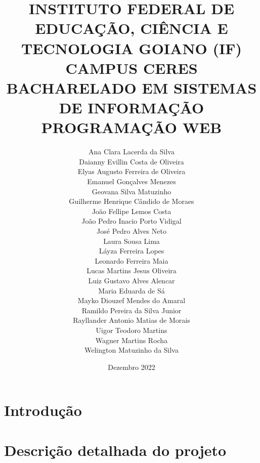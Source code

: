 \documentclass[12pt]{article}
\begin{document}
	\title{\textbf{ INSTITUTO FEDERAL DE EDUCAÇÃO, CIÊNCIA E TECNOLOGIA GOIANO (IF)\\CAMPUS CERES\\  BACHARELADO EM SISTEMAS DE INFORMAÇÃO\\PROGRAMAÇÃO  WEB}} 
	
	\author{Ana Clara Lacerda da Silva\\ Daianny Evillin Costa de Oliveira\\ Elyas Augusto Ferreira de Oliveira\\ Emanuel Gonçalves Menezes\\ Geovana Silva Matuzinho\\ Guilherme Henrique Cândido de Moraes\\ João Fellipe Lemos Costa\\ João Pedro Inacio Porto Vidigal\\ José Pedro Alves Neto\\ Laura Sousa Lima\\ Láyza Ferreira Lopes\\ Leonardo Ferreira Maia\\ Lucas Martins Jesus Oliveira\\ Luiz Gustavo Alves Alencar\\ Maria Eduarda de Sá\\ Mayko Diouzef Mendes do Amaral\\ Ramildo Pereira da Silva Junior\\ Rayllander Antonio Matias de Morais\\ Uigor Teodoro Martins\\ Wagner Martins Rocha\\ Welington Matuzinho da Silva}
	\date{Dezembro 2022}
	\maketitle
	\thispagestyle{empty} %
	\newpage
	
	\setcounter{page}{1} %
	\tableofcontents
	\newpage
	
	\section{\textbf{Introdução}}	
	

	
	\section{Descrição detalhada do projeto}
	
\end{document}
